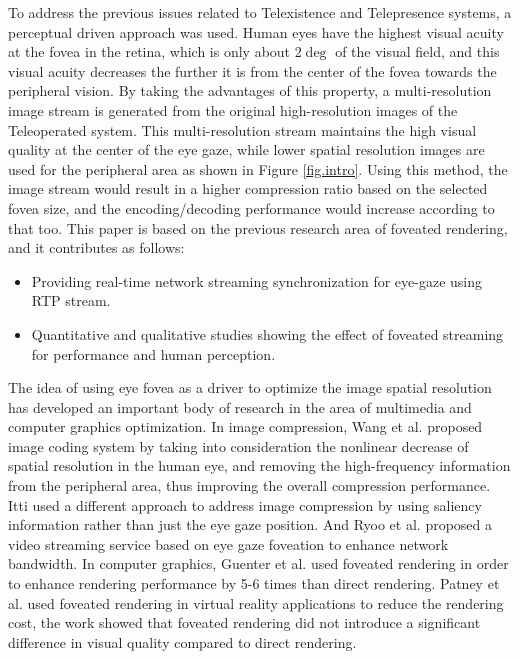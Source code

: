 To address the previous issues related to Telexistence and Telepresence systems, a perceptual driven approach was used. Human eyes have the highest visual acuity at the fovea in the retina, which is only about $2\deg$ of the visual field, and this visual acuity decreases the further it is from the center of the fovea towards the peripheral vision. By taking the advantages of this property, a multi-resolution image stream is generated from the original high-resolution images of the Teleoperated system. This multi-resolution stream maintains the high visual quality at the center of the eye gaze, while lower spatial resolution images are used for the peripheral area as shown in Figure \ref{fig.intro}. Using this method, the image stream would result in a higher compression ratio based on the selected fovea size, and the encoding/decoding performance would increase according to that too. This paper is based on the previous research area of foveated rendering, and it contributes as follows:
\begin{itemize}
\item Providing real-time network streaming synchronization for eye-gaze using RTP stream.
\item Quantitative and qualitative studies showing the effect of foveated streaming for performance and human perception.
\end{itemize} 

The idea of using eye fovea as a driver to optimize the image spatial resolution has developed an important body of research in the area of multimedia and computer graphics optimization. In image compression, Wang et al. \cite{wang2001embedded} proposed image coding system by taking into consideration the nonlinear decrease of spatial resolution in the human eye, and removing the high-frequency information from the peripheral area, thus improving the overall compression performance. Itti \cite{itti2004automatic} used a different approach to address image compression by using saliency information rather than just the eye gaze position. And Ryoo et al. \cite{ryoo2016design} proposed a video streaming service based on eye gaze foveation to enhance network bandwidth. In computer graphics, Guenter et al. \cite{guenter2012foveated} used foveated rendering in order to enhance rendering performance by 5-6 times than direct rendering. Patney et al. \cite{patney2016perceptually} used foveated rendering in virtual reality applications to reduce the rendering cost, the work showed that foveated rendering did not introduce a significant difference in visual quality compared to direct rendering.


